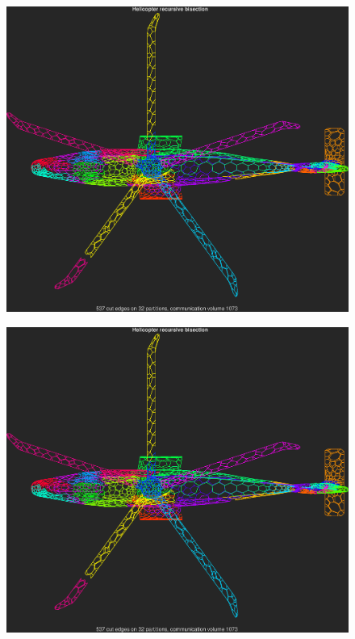 \documentclass[unicode,11pt,a4paper,oneside,numbers=endperiod,openany]{scrartcl}
\begin{document}
\begin{figure}[H]
    \begin{minipage}[H]{.45\textwidth}
        \centering
        \includegraphics[width=1\textwidth, trim={0 0.5cm 0 0.4cm}, clip]{./img/ex3/heli-rec-front-32}
        \label{fig:heli-rec-front-32}
    \end{minipage}
    \hfill
    \begin{minipage}[H]{.45\textwidth}
        \centering
        \includegraphics[width=1\textwidth, trim={0 0.5cm 0 0.5cm}, clip]{./img/ex3/heli-kway-front-32}

\end{minipage}
\end{figure}
\end{document}
